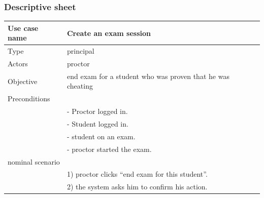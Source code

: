 \documentclass[]{uc2pfecaneva}
\begin{document}
\subsubsection{Descriptive sheet}
\begin{table}[h]
	\centering
	\begin{tabularx}{\textwidth}{|l|X|}
		\hline
		Use case name         & Create an exam session                                                                                                 \\ \hline
		Type                  & principal                                                                                                              \\ \hline
		Actors                & proctor                                                                                                                \\ \hline
		Objective             & end exam for a student who was proven that he was cheating                                                             \\ \hline
		Preconditions         &                                                                                                                        \\
		                      & - Proctor logged in.                                                                                                   \\
		                      & - Student logged in.                                                                                                   \\
		                      & - student on an exam.                                                                                                  \\
		                      & - proctor started the exam.                                                                                            \\ \hline
		nominal scenario      &                                                                                                                        \\
		                      & 1) proctor clicks “end exam for this student”.                                                                         \\
		                      & 2) the system asks him to confirm his action.                                                                          \\

\end{tabularx}
\end{table}
\end{document}
